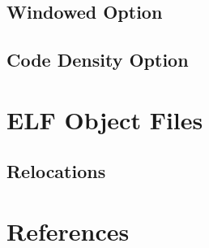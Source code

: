 \documentclass[oneside,11pt]{book}
\begin{document}
\section*{Windowed Option}


\newpage
\section*{Code Density Option}


\chapter*{ELF Object Files}
\section*{Relocations}


\chapter*{References}

\end{document}
